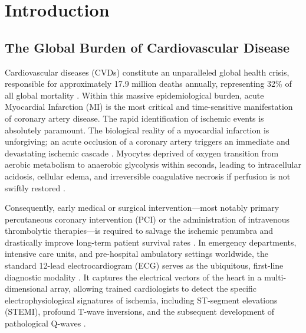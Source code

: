 \documentclass[10pt,twocolumn,letterpaper]{article}
\begin{document}
\section{Introduction}

\subsection{The Global Burden of Cardiovascular Disease}
Cardiovascular diseases (CVDs) constitute an unparalleled global health crisis, responsible for approximately 17.9 million deaths annually, representing 32\% of all global mortality \cite{feigin2022global, mozaffarian2016heart}. Within this massive epidemiological burden, acute Myocardial Infarction (MI) is the most critical and time-sensitive manifestation of coronary artery disease. The rapid identification of ischemic events is absolutely paramount. The biological reality of a myocardial infarction is unforgiving; an acute occlusion of a coronary artery triggers an immediate and devastating ischemic cascade \cite{kuriakose2020pathophysiology}. Myocytes deprived of oxygen transition from aerobic metabolism to anaerobic glycolysis within seconds, leading to intracellular acidosis, cellular edema, and irreversible coagulative necrosis if perfusion is not swiftly restored \cite{thygesen2018fourth}. 

Consequently, early medical or surgical intervention—most notably primary percutaneous coronary intervention (PCI) or the administration of intravenous thrombolytic therapies—is required to salvage the ischemic penumbra and drastically improve long-term patient survival rates \cite{saver2006time}. In emergency departments, intensive care units, and pre-hospital ambulatory settings worldwide, the standard 12-lead electrocardiogram (ECG) serves as the ubiquitous, first-line diagnostic modality \cite{harbison2003rapid}. It captures the electrical vectors of the heart in a multi-dimensional array, allowing trained cardiologists to detect the specific electrophysiological signatures of ischemia, including ST-segment elevations (STEMI), profound T-wave inversions, and the subsequent development of pathological Q-waves \cite{kothari1999cincinnati}.
\end{document}
